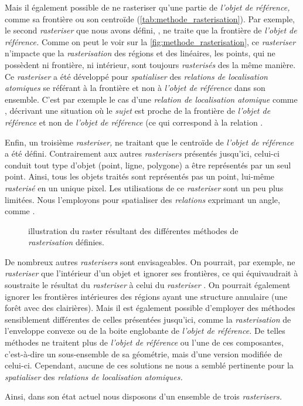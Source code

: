 Mais il également possible de ne rasteriser qu'une partie de
\emph{l'objet de référence,} comme sa frontière ou son centroïde
(\autoref{tab:methode_rasterisation}). Par exemple, le second
\emph{rasteriser} que nous avons défini, , ne traite
que la frontière de \emph{l'objet de référence.} Comme on peut le voir
sur la \autoref{fig:methode_rasterisation}, ce \emph{rasteriser}
n'impacte que la \emph{rasterisation} des régions et des linéaires,
les points, qui ne possèdent ni frontière, ni intérieur, sont toujours
\emph{rasterisés} des la même manière. Ce \emph{rasteriser} a été
développé pour \emph{spatialiser} des \emph{relations de localisation
  atomiques} se référant à la frontière et non à \emph{l'objet de
  référence} dans son ensemble. C'est par exemple le cas d'une
\emph{relation de localisation atomique} comme
, décrivant une situation où le
\emph{sujet} est proche de la frontière de \emph{l'objet de référence}
et non de \emph{l'objet de référence} (ce qui correspond à la relation
.

Enfin, un troisième \emph{rasteriser,} ne traitant que le centroïde de
\emph{l'objet de référence} a été défini. Contrairement aux autres
\emph{rasterisers} présentés jusqu'ici, celui-ci conduit tout type
d'objet (\ie point, ligne, polygone) a être représentés par un seul
point. Ainsi, tous les objets traités sont représentés pas un point,
lui-même \emph{rasterisé} en un unique pixel. Les utilisations de ce
\emph{rasteriser} sont un peu plus limitées. Nous l'employons pour
spatialiser des \emph{relations} exprimant un angle, comme
.

\begin{figure}
  \centering
  
  \caption{illustration du raster résultant des différentes méthodes
    de \emph{rasterisation} définies.}
  \label{fig:methode_rasterisation}
\end{figure}

De nombreux autres \emph{rasterisers} sont envisageables. On pourrait,
par exemple, ne \emph{rasteriser} que l'intérieur d'un objet et
ignorer ses frontières, ce qui équivaudrait à soustraite le résultat
du \emph{rasteriser}  à celui du \emph{rasteriser}
. On pourrait également ignorer les frontières
intérieures des régions ayant une structure annulaire (\eg une forêt
avec des clairières). Mais il est également possible d'employer des
méthodes sensiblement différentes de celles présentées jusqu'ici,
comme la \emph{rasterisation} de l'enveloppe convexe ou de la boite
englobante de \emph{l'objet de référence.} De telles méthodes ne
traitent plus de \emph{l'objet de référence} ou l'une de ces
composantes, c'est-à-dire un sous-ensemble de sa géométrie, mais d'une
version modifiée de celui-ci. Cependant, aucune de ces solutions ne
nous a semblé pertinente pour la \emph{spatialiser} des
\emph{relations de localisation atomiques.}

Ainsi, dans son état actuel nous disposons d'un ensemble de trois
\emph{rasterisers.}

